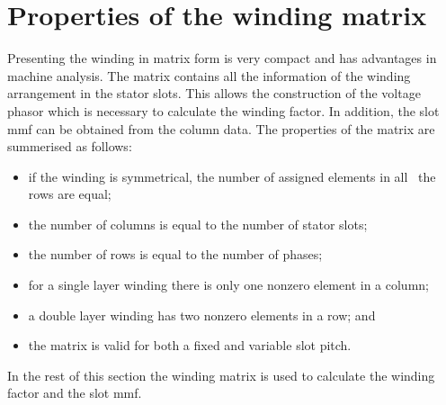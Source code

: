 \section{Properties of the winding matrix}
Presenting the winding in matrix form is very compact and has advantages in machine analysis. The matrix contains all the information of the winding arrangement in the stator slots. This allows the construction of the voltage phasor which is necessary to calculate the winding factor. In addition, the slot mmf can be obtained from the column data. The properties of the matrix are summerised as follows:
\begin{itemize}
  \item if the winding is symmetrical, the number of assigned elements in all~%
  the rows are equal;
  \item the number of columns is equal to the number of stator slots;
  \item the number of rows is equal to the number of phases;
  \item for a single layer winding there is only one nonzero element in a column;
  \item a double layer winding has two nonzero elements in a row; and
  \item the matrix is valid for both a fixed and variable slot pitch.
\end{itemize}
In the rest of this section the winding matrix is used to calculate the winding factor and the slot mmf.

